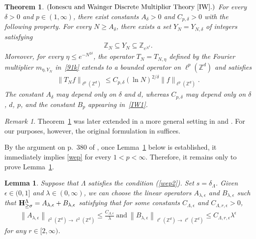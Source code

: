 \documentclass[11 pt,letterpaper]{amsart}
\theoremstyle{plain}
\newtheorem{theorem}{Theorem}\numberwithin{theorem}{section}
\newtheorem{lemma}{Lemma}\numberwithin{lemma}{section}
\theoremstyle{definition}
\theoremstyle{remark} \theoremstyle{exam} \theoremstyle{ob}
\newtheorem{remark}{Remark}\numberwithin{remark}{section}
\numberwithin{equation}{section}
\begin{document}
\begin{theorem}\label{lem82}
$(\text{Ionescu and Wainger Discrete Multiplier Theory \cite{IW}.})$ 
For every $\delta>0$ and $p\in(1,\infty)$, there exist constants
$A_{\delta}>0$ and $C_{p,\delta}>0$ with the following property.
For every $N\ge A_{\delta}$, there exists a set
$Y_N=Y_{N,\delta}$ of integers satisfying
\begin{align*}
	\mathbb{Z}_N
	\subseteq Y_N
	\subseteq \mathbb{Z}_{e^{N^\delta}}.
\end{align*}
Moreover, for every $\eta\le e^{-N^{2\delta}}$, the operator
$T_N=T_{N,\eta}$ defined by the Fourier multiplier
$m_{\eta,Y_N}$ in~\eqref{91k} extends to a bounded operator on
$\ell^p(\mathbb{Z}^d)$ and satisfies
\begin{align*}
	\|T_N f\|_{\ell^p(\mathbb{Z}^d)}
	\le
	C_{p,\delta}(\ln N)^{2/\delta}
	\|f\|_{\ell^p(\mathbb{Z}^d)}.
\end{align*}
The constant $A_{\delta}$ may depend only on $\delta$ and $d$,
whereas $C_{p,\delta}$ may depend only on $\delta$, $d$, $p$,
and the constant $B_p$ appearing in~\eqref{IW1}.
\end{theorem}

\begin{remark}
Theorem~\ref{lem82} was later extended in a more general setting in \cite{KMPW} and \cite{Tao}.
For our purposes, however, the original formulation in \cite{IW} suffices.
\end{remark}










By the argument on p.~380 of \cite{IW}, once Lemma~\ref{IW2} below is established, it immediately implies \eqref{wep} for every $1<p<\infty$.  Therefore, it remains only to prove Lemma~\ref{IW2}.




\begin{lemma}\label{IW2}
Suppose that $\Lambda$ satisfies   the  condition (\ref{wep2}). Set $s=\delta_{\Lambda}$.		Given   $\epsilon \in(0,1]$ and $\lambda \in(0, \infty)$, we can choose the linear operators $A_{\lambda, \epsilon}$ and $B_{\lambda, \epsilon}$ such that ${\bf H}_{\ge\sigma}^{\Lambda} =A_{\lambda, \epsilon} +B_{\lambda, \epsilon} $ satisfying that for some constants $C_{\Lambda,\epsilon}$ and $C_{\Lambda,r,\epsilon}>0$,
\begin{align*}
	\left\|A_{\lambda, \epsilon}\right\|_{\ell^{2}(\mathbb{Z}^d) \rightarrow \ell^{2}(\mathbb{Z}^d) } \leq \frac{C_{\Lambda,\epsilon}}{\lambda}\ \text{and}\ 
	\left\|B_{\lambda, \epsilon}\right\|_{\ell^{r}(\mathbb{Z}^d)  \rightarrow \ell^{r}(\mathbb{Z}^d) } \leq C_{\Lambda,r,\epsilon} \lambda^{\epsilon} 
\end{align*}
for any $r \in[2, \infty)$. 
\end{lemma}
\end{document}
